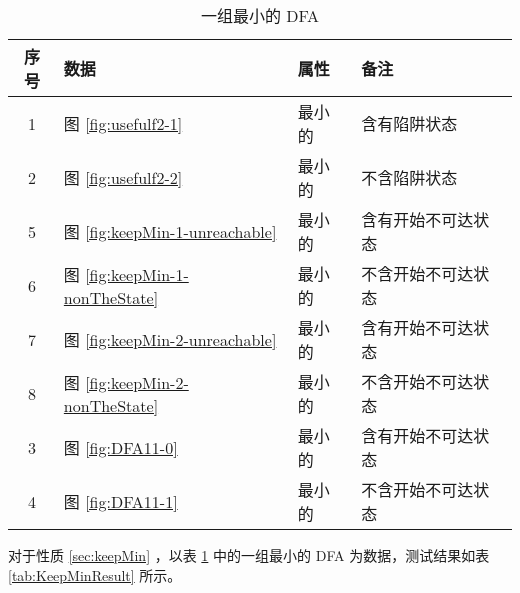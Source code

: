 \begin{table}[!htbp]
    \caption{一组最小的 DFA}
    \label{tab:KeepMinData}
    \centering
    \small%
    \setlength{\tabcolsep}{4pt}%
    \renewcommand{\arraystretch}{1.2}%
    \begin{tabular}{c p{4em}<{\centering} p{4em}<{\centering} l}  %
        \toprule %
                序号  &  数据 & 属性 & 备注 \\
        \midrule%
        1 &  图 \ref{fig:usefulf2-1} & 最小的 & 含有陷阱状态 \\
        2 &  图 \ref{fig:usefulf2-2} & 最小的 & 不含陷阱状态 \\
       \midrule
        5 & 图 \ref{fig:keepMin-1-unreachable} & 最小的 & 含有开始不可达状态 \\
        6 & 图 \ref{fig:keepMin-1-nonTheState} & 最小的 & 不含开始不可达状态 \\
       \midrule
        7 & 图 \ref{fig:keepMin-2-unreachable} & 最小的 & 含有开始不可达状态 \\
        8 & 图 \ref{fig:keepMin-2-nonTheState} & 最小的 & 不含开始不可达状态 \\
        \midrule
        3 & 图 \ref{fig:DFA11-0} & 最小的 & 含有开始不可达状态 \\
        4 & 图 \ref{fig:DFA11-1} & 最小的 & 不含开始不可达状态 \\
        \bottomrule%
    \end{tabular}
\end{table}


对于性质 \ref{sec:keepMin} ，以表 \ref{tab:KeepMinData} 中的一组最小的 DFA 为数据，测试结果如表 \ref{tab:KeepMinResult} 所示。




